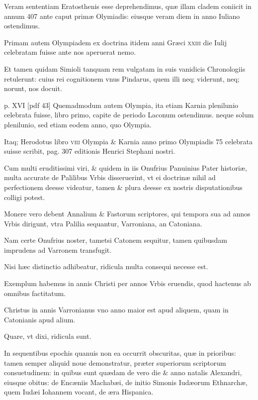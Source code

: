 \begin{parnumbers}
Veram sententiam
Eratosthenis esse deprehendimus, quæ illam cladem coniicit
in annum 407 ante caput primæ Olymiadis: eiusque veram
diem in anno Iuliano ostendimus.

Primam autem Olympiadem
ex doctrina itidem anni Græci \textsc{xxiii} die Iulij celebratam fuisse ante
nos aperuerat nemo.

Et tamen quidam Simioli tanquam rem
vulgatam in suis vanidicis Chronologiis retulerunt: cuius rei cognitionem
vnus Pindarus, quem illi neq; viderunt, neq; norunt, nos
docuit.


\clearpage
p. XVI [pdf 43]
Quemadmodum autem Olympia, ita etiam Karnia plenilunio
celebrata fuisse, libro primo, capite de periodo Laconum
ostendimus. neque solum plenilunio, sed etiam eodem anno, quo
Olympia.

Itaq; Herodotus libro \textsc{viii} Olympia \& Karnia anno primo
Olympiadis 75 celebrata suisse scribit, pag. 307 editionis Henrici
Stephani nostri.

Cum multi eruditissimi viri, \& quidem in iis
Onufrius Panuinius Pater historiæ, multa accurate de Palilibus Vrbis
disseruerint, vt ei doctrinæ nihil ad perfectionem deesse videatur,
tamen \& plura deesse ex nostris disputationibus colligi potest.

Monere vero debent Annalium \& Fastorum scriptores, qui tempora
sua ad annos Vrbis dirigunt, vtra Palilia sequantur, Varroniana,
an Catoniana.

Nam certe Onufrius noster, tametsi Catonem sequitur,
tamen quibusdam imprudens ad Varronem transfugit.

Nisi
hæc distinctio adhibeatur, ridicula multa consequi necesse est.

Exemplum habemus in annis Christi per annos Vrbis eruendis,
quod hactenus ab omnibus factitatum.

Christus in annis Varronianus
vno anno maior est apud aliquem, quam in Catonianis apud alium.

Quare, vt dixi, ridicula sunt.

In sequentibus epochis quanuis
non ea occurrit obscuritas, quæ in prioribus: tamen semper aliquid
noue demonstratur, præter superiorum scriptorum consuetudinem:
in quibus sunt quædam de vero die \& anno natalis Alexandri, eiusque
obitus: de Encæniis Machabæi, de initio Simonis Iudæorum
Ethnarchæ, quem Iudæi Iohannem vocant, de æra Hispanica.


\end{parnumbers}
